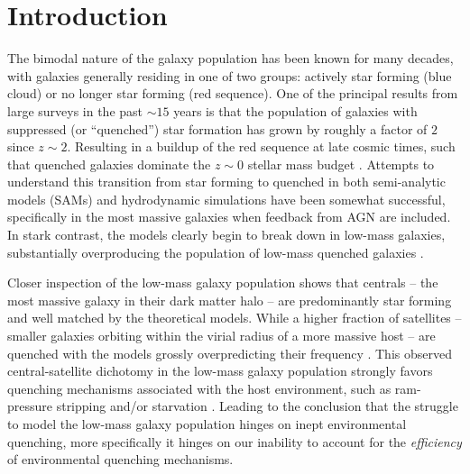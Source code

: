 
\newcommand{\vcirc}{v_{\rm{circ}}}
\newcommand{\vmax}{V_{\rm{max}}}
\newcommand{\rmax}{R_{\rm{max}}}
\newcommand{\mhalf}{M_{1/2}}
\newcommand{\rhalf}{R_{1/2}}
\newcommand{\mmax}{M_{\rm max}}
\newcommand{\msub}{M_{\rm{sub}}}
\newcommand{\mvir}{M_{\rm{vir}}}
\newcommand{\mhalo}{{M}_{\rm{halo}}}
\newcommand{\mpeak}{{M}_{\rm{peak}}}
\newcommand{\rvir}{R_{\rm{vir}}}
\newcommand{\vvir}{V_{\rm{vir}}}
\newcommand{\dd}{{\rm d}}
\newcommand{\mstar}{{\rm M}_{\star}}
\newcommand{\lstar}{L^{*}}
\newcommand{\msun}{{\rm M}_{\odot}}
\newcommand{\lsun}{L_{\odot}}
\newcommand{\mpc}{{\rm Mpc}}
\newcommand{\kpc}{{\rm kpc}}
\newcommand{\kms}{{\rm km \, s}^{-1}}
\newcommand{\millen}{MS-I}
\newcommand{\msii}{MS-II}
\newcommand{\lcdm}{$\Lambda$CDM}
\newcommand{\diso}{d_{\rm iso}}
\newcommand{\niso}{n_{\rm iso}}
\newcommand{\lt}{<}
\newcommand{\gt}{>}

\chapter{Introduction}


The bimodal nature of the galaxy population has been known for many
decades, with galaxies generally residing in one of two groups:
actively star forming (blue cloud) or no longer star forming (red
sequence).  
%
One of the principal results from large surveys in the past $\sim 15$
years is that the population of galaxies with suppressed (or
``quenched'') star formation has grown by roughly a factor of $2$
since $z \sim 2$. 
Resulting in a buildup of the red sequence at late cosmic times, such
that quenched galaxies dominate the $z \sim 0$ stellar mass budget
\citep{faber07}.  
%
Attempts to understand this transition from star forming to quenched
in both semi-analytic models (SAMs) and hydrodynamic simulations have
been somewhat successful, specifically in the most massive galaxies when
feedback from AGN are included.
%
In stark contrast, the models clearly begin to break down in low-mass
galaxies, substantially overproducing the population of low-mass
quenched galaxies \citep{kimm09}. 



Closer inspection of the low-mass galaxy population shows that
centrals -- the most massive galaxy in their dark matter halo -- are
predominantly star forming and well matched by the theoretical models.
%
While a higher fraction of satellites -- smaller galaxies orbiting
within the virial radius of a more massive host -- are quenched with
the models grossly overpredicting their frequency \citep{geha12,
  hirschmann14}. 
%
This observed central-satellite dichotomy in the 
low-mass galaxy population strongly favors quenching
mechanisms associated with the host environment, such as ram-pressure
stripping \citep[RPS,][]{gunn72} and/or starvation \citep{larson80}.
%
Leading to the conclusion that the struggle to model the low-mass
galaxy population hinges on inept environmental quenching,
more specifically it hinges on our inability to account for the
\emph{efficiency} of environmental quenching mechanisms.
%



